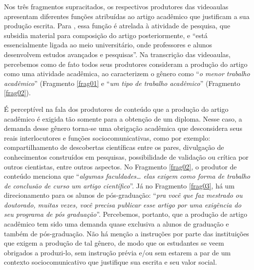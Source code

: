  











Nos três fragmentos supracitados, os respectivos produtores das
videoaulas apresentam diferentes funções atribuídas ao artigo acadêmico
que justificam a sua produção escrita. Para \textcite[p.~66]{motta-roth2010}, essa função é atrelada à atividade de pesquisa, que subsidia
material para composição do artigo posteriormente, e ``está
essencialmente ligada ao meio universitário, onde professores e alunos
desenvolvem estudos avançados e pesquisas''. Na transcrição das
videoaulas, percebemos como de fato todos seus produtores consideram a
produção do artigo como uma atividade acadêmica, ao caracterizem o
gênero como ``\emph{o menor trabalho acadêmico}'' (Fragmento \ref{frag01} 
e ``\emph{um tipo de trabalho acadêmico}'' (Fragmento \ref{frag02}\hspace{0pt}).

É perceptível na fala dos produtores de conteúdo que a produção do
artigo acadêmico é exigida tão somente para a obtenção de um diploma.
Nesse caso, a demanda desse gênero torna-se uma obrigação acadêmica que
desconsidera seus reais interlocutores e funções sociocomunicativas,
como por exemplo: compartilhamento de descobertas científicas entre os
pares, divulgação de conhecimentos construídos em pesquisas,
possibilidade de validação ou crítica por outros cientistas, entre
outros aspectos. No Fragmento \ref{frag02}, o produtor de conteúdo menciona que
``\emph{algumas faculdades\ldots{} elas exigem como forma de trabalho de
conclusão de curso um artigo científico}''. Já no Fragmento \ref{frag03}, há um direcionamento para os alunos de pós-graduação: ``\emph{pra
você que faz mestrado ou doutorado, muitas vezes, você precisa publicar
esse artigo por uma exigência do seu programa de pós graduação}''. 
Percebemos, portanto, que a produção de artigo acadêmico
tem sido uma demanda quase exclusiva a alunos de graduação e também de
pós-graduação. Não há menção a instruções por parte das instituições que
exigem a produção de tal gênero, de modo que os estudantes se veem
obrigados a produzi-lo, sem instrução prévia \cite{lillis1999} e/ou sem
estarem a par de um contexto sociocomunicativo que justifique sua
escrita e seu valor social.


